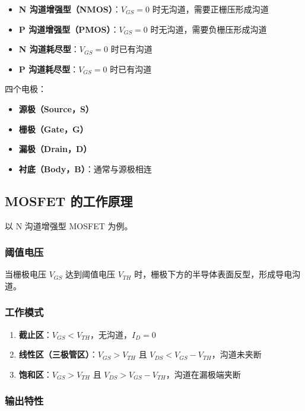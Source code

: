 \begin{itemize}
  \item \textbf{N 沟道增强型（NMOS）}：$V_{GS} = 0$ 时无沟道，需要正栅压形成沟道
  \item \textbf{P 沟道增强型（PMOS）}：$V_{GS} = 0$ 时无沟道，需要负栅压形成沟道
  \item \textbf{N 沟道耗尽型}：$V_{GS} = 0$ 时已有沟道
  \item \textbf{P 沟道耗尽型}：$V_{GS} = 0$ 时已有沟道
\end{itemize}

四个电极：
\begin{itemize}
  \item \textbf{源极（Source，S）}
  \item \textbf{栅极（Gate，G）}
  \item \textbf{漏极（Drain，D）}
  \item \textbf{衬底（Body，B）}：通常与源极相连
\end{itemize}

\subsection{MOSFET 的工作原理}

以 N 沟道增强型 MOSFET 为例。

\subsubsection{阈值电压}

当栅极电压 $V_{GS}$ 达到阈值电压 $V_{TH}$ 时，栅极下方的半导体表面反型，形成导电沟道。

\subsubsection{工作模式}

\begin{enumerate}
  \item \textbf{截止区}：$V_{GS} < V_{TH}$，无沟道，$I_D = 0$
  \item \textbf{线性区（三极管区）}：$V_{GS} > V_{TH}$ 且 $V_{DS} < V_{GS} - V_{TH}$，沟道未夹断
  \item \textbf{饱和区}：$V_{GS} > V_{TH}$ 且 $V_{DS} > V_{GS} - V_{TH}$，沟道在漏极端夹断
\end{enumerate}

\subsubsection{输出特性}

